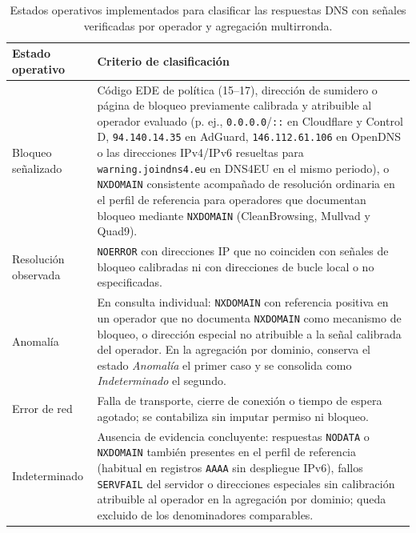 \documentclass[10pt,a4paper]{article}
\begin{document}
\begin{table}[H]
\centering\small
\caption{Estados operativos implementados para clasificar las respuestas DNS con señales verificadas por operador y agregación multirronda.}
\label{tab:estados}
\begin{tabularx}{\textwidth}{>{\raggedright\arraybackslash}p{3.2cm}Y}
\toprule
Estado operativo & Criterio de clasificación\\
\midrule
Bloqueo señalizado & Código EDE de política (15--17), dirección de sumidero o página de bloqueo previamente calibrada y atribuible al operador evaluado (p. ej., \texttt{0.0.0.0}/\texttt{::} en Cloudflare y Control D, \texttt{94.140.14.35} en AdGuard, \texttt{146.112.61.106} en OpenDNS o las direcciones IPv4/IPv6 resueltas para \texttt{warning.joindns4.eu} en DNS4EU en el mismo periodo), o \texttt{NXDOMAIN} consistente acompañado de resolución ordinaria en el perfil de referencia para operadores que documentan bloqueo mediante \texttt{NXDOMAIN} (CleanBrowsing, Mullvad y Quad9).\\
Resolución observada & \texttt{NOERROR} con direcciones IP que no coinciden con señales de bloqueo calibradas ni con direcciones de bucle local o no especificadas.\\
Anomalía & En consulta individual: \texttt{NXDOMAIN} con referencia positiva en un operador que no documenta \texttt{NXDOMAIN} como mecanismo de bloqueo, o dirección especial no atribuible a la señal calibrada del operador. En la agregación por dominio, conserva el estado \emph{Anomalía} el primer caso y se consolida como \emph{Indeterminado} el segundo.\\
Error de red & Falla de transporte, cierre de conexión o tiempo de espera agotado; se contabiliza sin imputar permiso ni bloqueo.\\
Indeterminado & Ausencia de evidencia concluyente: respuestas \texttt{NODATA} o \texttt{NXDOMAIN} también presentes en el perfil de referencia (habitual en registros \texttt{AAAA} sin despliegue IPv6), fallos \texttt{SERVFAIL} del servidor o direcciones especiales sin calibración atribuible al operador en la agregación por dominio; queda excluido de los denominadores comparables.\\
\bottomrule
\end{tabularx}
\end{table}
\end{document}
